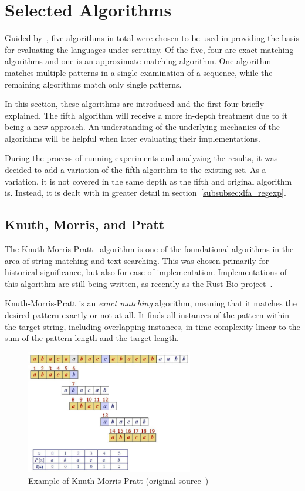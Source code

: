 \section{Selected Algorithms}
\label{sec:algorithms}

Guided by~\cite{rahate}, five algorithms in total were chosen to be used in providing the basis for evaluating the languages under scrutiny. Of the five, four are exact-matching algorithms and one is an approximate-matching algorithm. One algorithm matches multiple patterns in a single examination of a sequence, while the remaining algorithms match only single patterns.

In this section, these algorithms are introduced and the first four briefly explained. The fifth algorithm will receive a more in-depth treatment due to it being a new approach. An understanding of the underlying mechanics of the algorithms will be helpful when later evaluating their implementations.

During the process of running experiments and analyzing the results, it was decided to add a variation of the fifth algorithm to the existing set. As a variation, it is not covered in the same depth as the fifth and original algorithm is. Instead, it is dealt with in greater detail in section~\ref{subsubsec:dfa_regexp}.

\subsection{Knuth, Morris, and Pratt}

The Knuth-Morris-Pratt~\cite{knuth} algorithm is one of the foundational algorithms in the area of string matching and text searching. This was chosen primarily for historical significance, but also for ease of implementation. Implementations of this algorithm are still being written, as recently as the Rust-Bio project~\cite{rust}.

Knuth-Morris-Pratt is an \textit{exact matching} algorithm, meaning that it matches the desired pattern exactly or not at all. It finds all instances of the pattern within the target string, including overlapping instances, in time-complexity linear to the sum of the pattern length and the target length.

\begin{figure}[ht]
    \centering
    \includegraphics[width=0.65\textwidth]{figures/kmpexample.jpg}
    \caption[Example of Knuth-Morris-Pratt algorithm]{Example of Knuth-Morris-Pratt (original source~\cite{shandilya})}
    \label{fig:image:kmpexample}
\end{figure}

